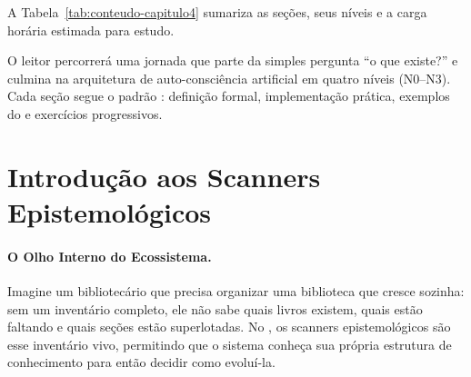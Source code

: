 A Tabela~\ref{tab:conteudo-capitulo4} sumariza as seções, seus níveis e a
carga horária estimada para estudo.

\begin{table}[htb]
\centering
    \small
\caption{Conteúdo do Capítulo 4}
\label{tab:conteudo-capitulo4}
\end{table}

O leitor percorrerá uma jornada que parte da simples pergunta ``o que existe?''
e culmina na arquitetura de auto-consciência artificial em quatro níveis
(N0--N3). Cada seção segue o padrão \sdd{}: definição formal, implementação
prática, exemplos do \opencodeeco{} e exercícios progressivos.

\section{Introdução aos Scanners Epistemológicos}
\label{sec:introducao-scanners}
\nivelzero

\paragraph{O Olho Interno do Ecossistema.} Imagine um bibliotecário que precisa organizar uma biblioteca que cresce sozinha: sem um inventário completo, ele não sabe quais livros existem, quais estão faltando e quais seções estão superlotadas. No \opencodeeco{}, os scanners epistemológicos são esse inventário vivo, permitindo que o sistema conheça sua própria estrutura de conhecimento para então decidir como evoluí-la.


